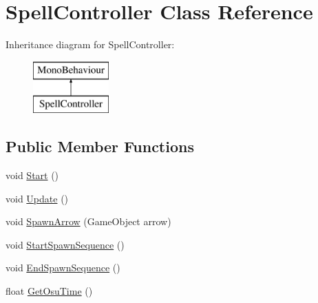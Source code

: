 \hypertarget{class_spell_controller}{}\section{Spell\+Controller Class Reference}
\label{class_spell_controller}
Inheritance diagram for Spell\+Controller\+:\begin{figure}[H]
\begin{center}
\leavevmode
\includegraphics[height=2.000000cm]{class_spell_controller}
\end{center}
\end{figure}
\subsection*{Public Member Functions}
\begin{DoxyCompactItemize}
\item 
void \hyperlink{class_spell_controller_a63da1ad10f9cb7931912cd60704875f5}{Start} ()
\item 
void \hyperlink{class_spell_controller_a21bc9cc1d9dcf0fdebc52754a9008552}{Update} ()
\item 
void \hyperlink{class_spell_controller_a779832e1b2aa56a36708f5fe7c7cc434}{Spawn\+Arrow} (Game\+Object arrow)
\item 
void \hyperlink{class_spell_controller_a60e9f69e1644149911c54e667a297ba8}{Start\+Spawn\+Sequence} ()
\item 
void \hyperlink{class_spell_controller_a9b3f29e4230fcdf1b601c6a8d49574e0}{End\+Spawn\+Sequence} ()
\item 
float \hyperlink{class_spell_controller_ad6e891fc9dd19a3eccec2a05791abff4}{Get\+Osu\+Time} ()
\end{DoxyCompactItemize}
